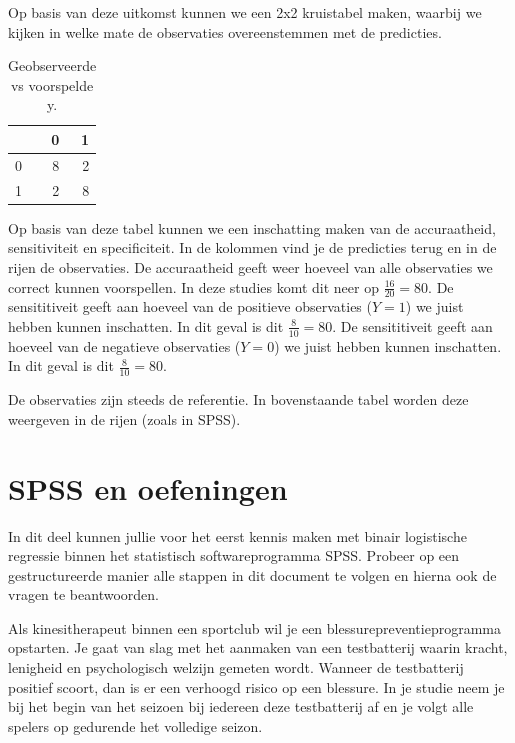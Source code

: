 \documentclass[
]{book}
\theoremstyle{definition}
\theoremstyle{definition}
\theoremstyle{definition}
\theoremstyle{definition}
\theoremstyle{remark}
\begin{document}
Op basis van deze uitkomst kunnen we een 2x2 kruistabel maken, waarbij we kijken in welke mate de observaties overeenstemmen met de predicties.

\begin{table}

\caption{\label{tab:kruiseval}Geobserveerde vs voorspelde y.}
\centering
\begin{tabular}[t]{lrr}
\toprule
  & 0 & 1\\
\midrule
0 & 8 & 2\\
1 & 2 & 8\\
\bottomrule
\end{tabular}
\end{table}

Op basis van deze tabel kunnen we een inschatting maken van de accuraatheid, sensitiviteit en specificiteit. In de kolommen vind je de predicties terug en in de rijen de observaties. De accuraatheid geeft weer hoeveel van alle observaties we correct kunnen voorspellen. In deze studies komt dit neer op \(\frac{16}{20} = 80%
\). De sensititiveit geeft aan hoeveel van de positieve observaties (\(Y = 1\)) we juist hebben kunnen inschatten. In dit geval is dit \(\frac{8}{10} = 80%
\). De sensititiveit geeft aan hoeveel van de negatieve observaties (\(Y = 0\)) we juist hebben kunnen inschatten. In dit geval is dit \(\frac{8}{10} = 80%
\).

De observaties zijn steeds de referentie. In bovenstaande tabel worden deze weergeven in de rijen (zoals in SPSS).

\hypertarget{spss-en-oefeningen-1}{%
\section*{SPSS en oefeningen}\label{spss-en-oefeningen-1}}


In dit deel kunnen jullie voor het eerst kennis maken met binair logistische regressie binnen het statistisch softwareprogramma SPSS. Probeer op een gestructureerde manier alle stappen in dit document te volgen en hierna ook de vragen te beantwoorden.

Als kinesitherapeut binnen een sportclub wil je een blessurepreventieprogramma opstarten. Je gaat van slag met het aanmaken van een testbatterij waarin kracht, lenigheid en psychologisch welzijn gemeten wordt. Wanneer de testbatterij positief scoort, dan is er een verhoogd risico op een blessure. In je studie neem je bij het begin van het seizoen bij iedereen deze testbatterij af en je volgt alle spelers op gedurende het volledige seizon.
\end{document}
